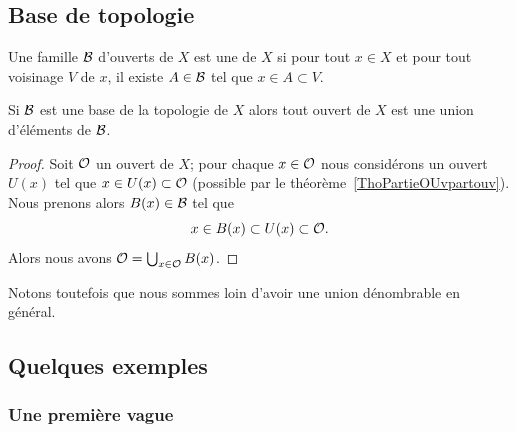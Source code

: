 \subsection{Base de topologie}

\begin{definition}   \label{DefQELfbBEyiB}
    Une famille \( \mathcal{B}\) d'ouverts de \( X\) est une  de \( X\) si pour tout \( x\in X\) et pour tout voisinage \( V\) de \( x\), il existe \( A\in \mathcal{B}\) tel que \( x\in A\subset V\).
\end{definition}

\begin{proposition} \label{PropMMKBjgY}
    Si \( \mathcal{B}\) est une base de la topologie de \( X\) alors tout ouvert de \( X\) est une union d'éléments de \( \mathcal{B}\).
\end{proposition}

\begin{proof}
    Soit \( \mathcal{O}\) un ouvert de \( X\); pour chaque \( x\in\mathcal{O}\) nous considérons un ouvert \( U(x)\) tel que \( x\in U(x)\subset \mathcal{O}\) (possible par le théorème~\ref{ThoPartieOUvpartouv}). Nous prenons alors \( B(x)\in\mathcal{B}\) tel que
    \begin{equation}
        x\in B(x)\subset U(x)\subset \mathcal{O}.
    \end{equation}
    Alors nous avons \( \mathcal{O}=\bigcup_{x\in \mathcal{O}}B(x)\).
\end{proof}
Notons toutefois que nous sommes loin d'avoir une union dénombrable en général.

\subsection{Quelques exemples}

\subsubsection{Une première vague}

